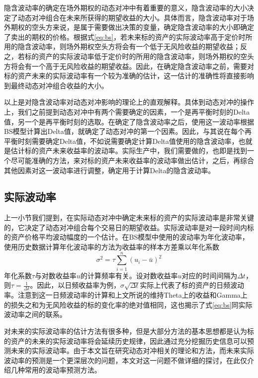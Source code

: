 隐含波动率的确定在场外期权的动态对冲中有着重要的意义，隐含波动率的大小决定了动态对冲组合在未来所获得的期望收益的大小。具体而言，隐含波动率对于场外期权的空头方来说，是属于需要做出决策的变量，确定隐含波动率的大小即确定了卖出的期权的价格。根据式\ref{eq:bs}，若未来标的资产的实际波动率高于定价时所用的隐含波动率，则场外期权空头方将会有一个低于无风险收益的期望收益；反之，若标的资产的实际波动率低于定价时的所用的隐含波动率，则场外期权的空头方将会有一个高于无风险收益的期望收益。因此，在确定隐含波动率之前，需要对标的资产未来的实际波动率有一个较为准确的估计，这一估计的准确性将直接影响到最终动态对冲组合收益的大小。

以上是对隐含波动率对动态对冲影响的理论上的直观解释。具体到动态对冲的操作上，我们之前提到动态对冲中有两个需要确定的因素，一个是再平衡时刻的Delta值，另一个是再平衡时刻的选取。在确定了隐含波动率之后，使用这一波动率根据BS模型计算出Delta值，就确定了动态对冲的第一个因素。因此，与其说在每个再平衡时刻需要确定Delta值，不如说需要确定计算Delta值使用的隐含波动率，也就是估计标的资产未来收益率的波动率。实际生产中，我们需要做的，也即是找到一个尽可能准确的方法，来对标的资产未来收益率的波动率做出估计，之后，再综合其他因素对这一波动率进行调整，确定用于计算Delta的隐含波动率。

\subsection{实际波动率}

上一小节我们提到，在实际动态对冲中确定未来标的资产的实际波动率是非常关键的，它决定了动态对冲组合每个交易日的期望收益。实际波动率是对一段时间内标的资产价格平均波动幅度的一个估计。在BS模型中使用的波动率为年化波动率，使用历史数据计算年化波动率的方法为收益率的样本方差乘以年化系数
\begin{equation}
  \sigma^2=\tau\sum_{i=1}^n (u_i-\bar{u})^2
\end{equation}
年化系数$\tau$与对数收益率$u$的计算频率有关。设对数收益率$u$对应的时间间隔为$\Delta t$，则$\tau=\frac{1}{\Delta t}$。因此，以日频收益率为例，$\sigma \sqrt{\Delta t}$实际上代表了标的资产的日频波动率。注意到这一日频波动率的计算和上文所说的维持Theta上的收益和Gamma上的损失之和为无风险收益的标的变化率的绝对值相同，这也揭示了式\ref{eq:bs}同实际波动率之间的联系。

对未来的实际波动率的估计方法有很多种，但是大部分方法的基本思想都是认为标的资产的未来的实际波动率将会延续历史规律，因此通过充分挖掘历史信息可以预测未来的实际波动率。由于本文旨在研究动态对冲相关的理论和方法，而未来实际波动率的预测是一个更深层次的问题，本文对这一问题不做详细的探讨，在此仅介绍几种常用的波动率预测方法。

